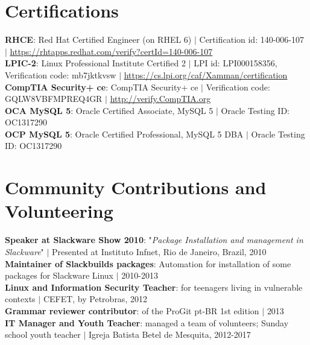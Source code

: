 \documentclass[letterpaper,11pt]{article}
\begin{document}
\section{Certifications}
 \begin{itemize}[leftmargin=0.15in, label={}]
    \small{\item{
            \textbf{RHCE}{: Red Hat Certified Engineer (on RHEL 6)} $|$ \scriptsize{Certification id: 140-006-107} $|$ \tiny\href{https://rhtapps.redhat.com/verify?certId=140-006-107}{\underline{https://rhtapps.redhat.com/verify?certId=140-006-107}} \\
            \small\textbf{LPIC-2}{: Linux Professional Institute Certified 2} $|$ \scriptsize{LPI id: LPI000158356, Verification code: mb7jktkvsw} $|$ \tiny\href{https://cs.lpi.org/caf/Xamman/certification}{\underline{https://cs.lpi.org/caf/Xamman/certification}} \\
            \small\textbf{CompTIA Security+ ce}{: CompTIA Security+ ce} $|$ \scriptsize{Verification code: GQLW8VBFMPREQ4GR} $|$ \tiny\href{http://verify.CompTIA.org}{\underline{http://verify.CompTIA.org}} \\
            \small\textbf{OCA MySQL 5}{: Oracle Certified Associate, MySQL 5} $|$ \scriptsize{Oracle Testing ID: OC1317290} \\
            \small\textbf{OCP MySQL 5}{: Oracle Certified Professional, MySQL 5 DBA} $|$ \scriptsize{Oracle Testing ID: OC1317290}
        }}
 \end{itemize}

%
\section{Community Contributions and Volunteering}
 \begin{itemize}[leftmargin=0.15in, label={}]
    \small{\item{
            \textbf{Speaker at Slackware Show 2010}{: "\emph{Package Installation and management in Slackware}"} $|$ \tiny{Presented at Instituto Infnet, Rio de Janeiro, Brazil, 2010} \\
            \small\textbf{Maintainer of Slackbuilds packages}{: Automation for installation of some packages for Slackware Linux} $|$ \tiny{2010-2013} \\
            \small\textbf{Linux and Information Security Teacher}{: for teenagers living in vulnerable contexts} $|$ \tiny{CEFET, by Petrobras, 2012} \\
            \small\textbf{Grammar reviewer contributor}{: of the ProGit pt-BR 1st edition} $|$ \tiny{2013} \\
            \small\textbf{IT Manager and Youth Teacher}{: managed a team of volunteers; Sunday school youth teacher} $|$ \tiny{Igreja Batista Betel de Mesquita, 2012-2017}
    }}
 \end{itemize}

\end{document}
